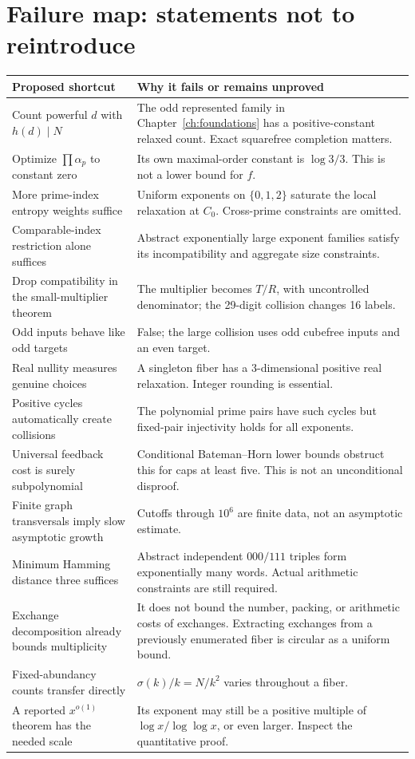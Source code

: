 \section{Failure map: statements not to reintroduce}
\begin{longtable}{@{}p{}p{}@{}}
\toprule Proposed shortcut & Why it fails or remains unproved\\\midrule\endhead
Count powerful $d$ with $h(d)\mid N$ & The odd represented family in Chapter~\ref{ch:foundations} has a positive-constant relaxed count. Exact squarefree completion matters.\\
Optimize $\prod\alpha_p$ to constant zero & Its own maximal-order constant is $\log3/3$. This is not a lower bound for $f$.\\
More prime-index entropy weights suffice & Uniform exponents on $\{0,1,2\}$ saturate the local relaxation at $C_0$. Cross-prime constraints are omitted.\\
Comparable-index restriction alone suffices & Abstract exponentially large exponent families satisfy its incompatibility and aggregate size constraints.\\
Drop compatibility in the small-multiplier theorem & The multiplier becomes $T/R$, with uncontrolled denominator; the 29-digit collision changes 16 labels.\\
Odd inputs behave like odd targets & False; the large collision uses odd cubefree inputs and an even target.\\
Real nullity measures genuine choices & A singleton fiber has a 3-dimensional positive real relaxation. Integer rounding is essential.\\
Positive cycles automatically create collisions & The polynomial prime pairs have such cycles but fixed-pair injectivity holds for all exponents.\\
Universal feedback cost is surely subpolynomial & Conditional Bateman--Horn lower bounds obstruct this for caps at least five. This is not an unconditional disproof.\\
Finite graph transversals imply slow asymptotic growth & Cutoffs through $10^6$ are finite data, not an asymptotic estimate.\\
Minimum Hamming distance three suffices & Abstract independent $000/111$ triples form exponentially many words. Actual arithmetic constraints are still required.\\
Exchange decomposition already bounds multiplicity & It does not bound the number, packing, or arithmetic costs of exchanges. Extracting exchanges from a previously enumerated fiber is circular as a uniform bound.\\
Fixed-abundancy counts transfer directly & $\sigma(k)/k=N/k^2$ varies throughout a fiber.\\
A reported $x^{o(1)}$ theorem has the needed scale & Its exponent may still be a positive multiple of $\log x/\log\log x$, or even larger. Inspect the quantitative proof.\\
\bottomrule
\end{longtable}


